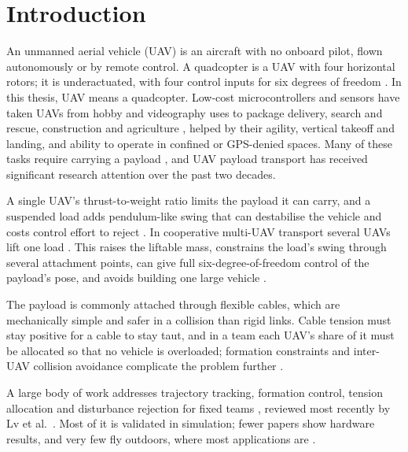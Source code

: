 \section{Introduction}

An unmanned aerial vehicle (UAV) is an aircraft with no onboard pilot, flown autonomously or by remote control. A quadcopter is a UAV with four horizontal rotors; it is underactuated, with four control inputs for six degrees of freedom \cite{kotaruDifferentialflatnessControlQuadrotors2018}. In this thesis, UAV means a quadcopter. Low-cost microcontrollers and sensors have taken UAVs from hobby and videography uses to package delivery, search and rescue, construction and agriculture \cite{kardaszDronesPossibilitiesTheir2016, olleroPresentFutureAerial2022}, helped by their agility, vertical takeoff and landing, and ability to operate in confined or GPS-denied spaces. Many of these tasks require carrying a payload \cite{thusooQUADROTORSPRESENTERA2021, choiOverviewDroneApplications2023}, and UAV payload transport has received significant research attention over the past two decades.

A single UAV's thrust-to-weight ratio limits the payload it can carry, and a suspended load adds pendulum-like swing that can destabilise the vehicle and costs control effort to reject \cite{geronelDynamicResponsesDue2023}. In cooperative multi-UAV transport several UAVs lift one load \cite{Carney_2022}. This raises the liftable mass, constrains the load's swing through several attachment points, can give full six-degree-of-freedom control of the payload's pose, and avoids building one large vehicle \cite{tudelft, mohammadiDecentralizedMotionControl2018}.

The payload is commonly attached through flexible cables, which are mechanically simple and safer in a collision than rigid links. Cable tension must stay positive for a cable to stay taut, and in a team each UAV's share of it must be allocated so that no vehicle is overloaded; formation constraints and inter-UAV collision avoidance complicate the problem further \cite{kotaruDynamicsControlQuadrotor2017}.

A large body of work addresses trajectory tracking, formation control, tension allocation and disturbance rejection for fixed teams \cite{wangRobustCooperativeTransportation2024, gimenezMultiobjectiveControlCooperative2018, wahbaKinodynamicMotionPlanning2024}, reviewed most recently by Lv et al.\ \cite{lv2026review}. Most of it is validated in simulation; fewer papers show hardware results, and very few fly outdoors, where most applications are \cite{estevezReviewAerialTransportation2024}.

